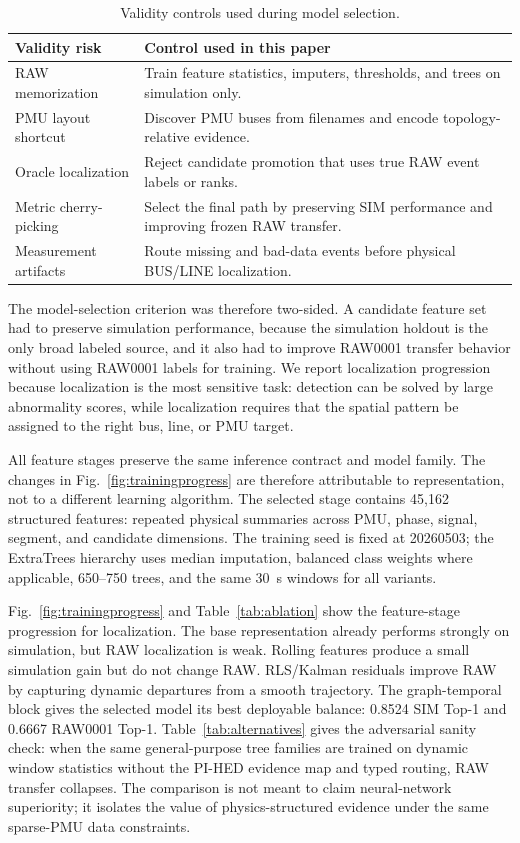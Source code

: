 \documentclass[conference]{IEEEtran}
\begin{document}
\begin{table}[t]
\centering
\caption{Validity controls used during model selection.}
\label{tab:safeguards}
\renewcommand{\arraystretch}{1.05}
\footnotesize
\begin{tabular}{@{}p{}p{}@{}}
\toprule
\textbf{Validity risk} & \textbf{Control used in this paper} \\
\midrule
RAW memorization & Train feature statistics, imputers, thresholds, and trees on simulation only. \\
PMU layout shortcut & Discover PMU buses from filenames and encode topology-relative evidence. \\
Oracle localization & Reject candidate promotion that uses true RAW event labels or ranks. \\
Metric cherry-picking & Select the final path by preserving SIM performance and improving frozen RAW transfer. \\
Measurement artifacts & Route missing and bad-data events before physical BUS/LINE localization. \\
\bottomrule
\end{tabular}
\end{table}

The model-selection criterion was therefore two-sided. A candidate feature set had to preserve simulation performance, because the simulation holdout is the only broad labeled source, and it also had to improve RAW0001 transfer behavior without using RAW0001 labels for training. We report localization progression because localization is the most sensitive task: detection can be solved by large abnormality scores, while localization requires that the spatial pattern be assigned to the right bus, line, or PMU target.

All feature stages preserve the same inference contract and model family. The changes in Fig.~\ref{fig:trainingprogress} are therefore attributable to representation, not to a different learning algorithm. The selected stage contains 45,162 structured features: repeated physical summaries across PMU, phase, signal, segment, and candidate dimensions. The training seed is fixed at 20260503; the ExtraTrees hierarchy uses median imputation, balanced class weights where applicable, 650--750 trees, and the same 30~s windows for all variants.

Fig.~\ref{fig:trainingprogress} and Table~\ref{tab:ablation} show the feature-stage progression for localization. The base representation already performs strongly on simulation, but RAW localization is weak. Rolling features produce a small simulation gain but do not change RAW. RLS/Kalman residuals improve RAW by capturing dynamic departures from a smooth trajectory. The graph-temporal block gives the selected model its best deployable balance: 0.8524 SIM Top-1 and 0.6667 RAW0001 Top-1. Table~\ref{tab:alternatives} gives the adversarial sanity check: when the same general-purpose tree families are trained on dynamic window statistics without the PI-HED evidence map and typed routing, RAW transfer collapses. The comparison is not meant to claim neural-network superiority; it isolates the value of physics-structured evidence under the same sparse-PMU data constraints.
\end{document}

